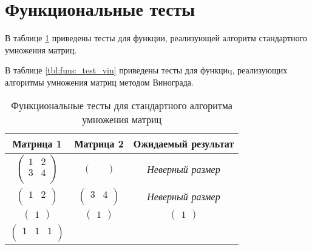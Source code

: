 \section{Функциональные тесты}
В таблице \ref{tbl:func_test_std} приведены тесты для функции, реализующей алгоритм стандартного умножения матриц.

В таблице \ref{tbl:func_test_vin} приведены тесты для функциq, реализующих алгоритмы умножения матриц методом Винограда.

\begin{table}[h!]
    \caption{Функциональные тесты для стандартного алгоритма умножения матриц}
    \label{tbl:func_test_std}
    \centering
        \begin{tabular}{||c c c||} 
        \hline
        Матрица 1& Матрица 2& Ожидаемый результат \\
        \hline\hline
        $\begin{pmatrix}
            1 & 2\\
            3 & 4\\
        \end{pmatrix}$ 
        &  
        $\begin{pmatrix}
            &
        \end{pmatrix}$
        &
        \textit{Неверный размер} \\
        \hline
        $\begin{pmatrix}
            1 & 2\\
        \end{pmatrix}$ 
        &  
        $\begin{pmatrix}
            3 & 4\\
        \end{pmatrix}$
        &
        \textit{Неверный размер} \\
        \hline
        $\begin{pmatrix}
            1
        \end{pmatrix}$ 
        &  
        $\begin{pmatrix}
            1
        \end{pmatrix}$
        &
        $\begin{pmatrix}
            1
        \end{pmatrix}$ \\
        \hline
        $\begin{pmatrix}
            1 & 1 & 1\\
        \end{pmatrix}$ 
        &  

\end{tabular}
\end{table}

